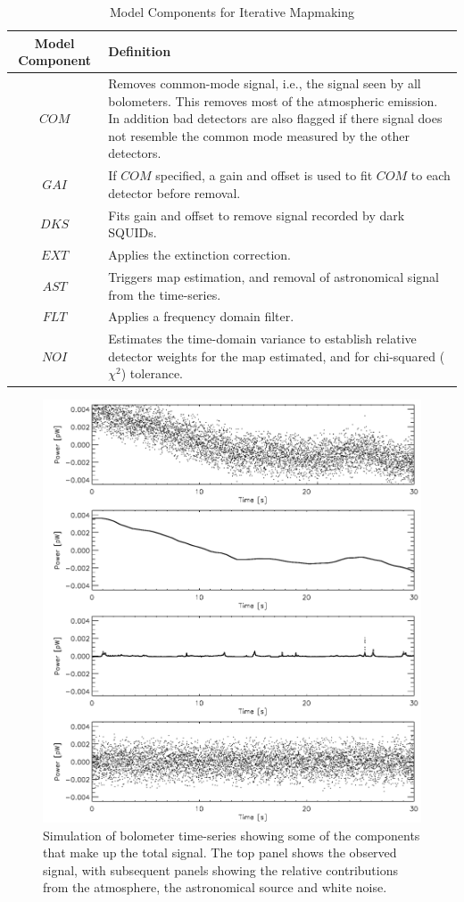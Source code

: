 \documentclass[twoside,11pt]{article}
\renewcommand{\_}{\texttt{\symbol{95}}}
\begin{document}
\begin{table}
\begin{tabular}{cp{10cm}}
 Model Component & Definition \\
\hline
$COM$ & Removes common-mode signal, i.e., the signal seen by all bolometers. This removes most of the atmospheric emission. In addition bad detectors are also flagged if there signal does not resemble the common mode measured by the other detectors. \\
$GAI$ & If $COM$ specified, a gain and offset is used to fit $COM$ to each detector before removal. \\
$DKS$ & Fits gain and offset to remove signal recorded by dark SQUIDs. \\
$EXT$ & Applies the extinction correction. \\
$AST$ & Triggers map estimation, and removal of astronomical signal from the time-series. \\
$FLT$ & Applies a frequency domain filter. \\
$NOI$ & Estimates the time-domain variance to establish relative detector weights for the map estimated, and for chi-squared ($\chi^2$) tolerance. \\
\hline
\end{tabular}
\caption{Model Components for Iterative Mapmaking}
\label{tab:dimm_components}
\end{table}

\begin{figure}[htb]
  \begin{center}
    \includegraphics[width=0.76\linewidth]{sun258_signalcpts}
    \caption{Simulation of bolometer time-series showing some of the
      components that make up the total signal. The top panel shows
      the observed signal, with subsequent panels showing the relative
      contributions from the atmosphere, the astronomical source and
      white noise.}
    \label{fig:comps}
  \end{center}
\end{figure}
\end{document}
